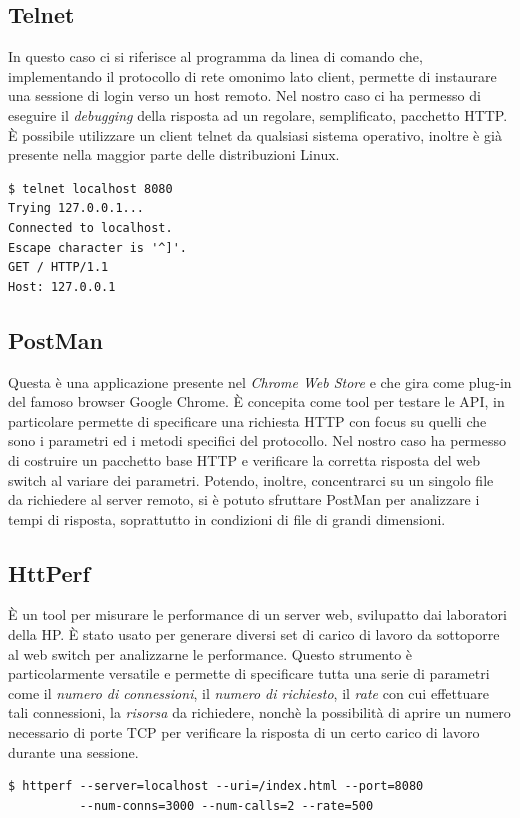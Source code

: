 \documentclass[italian]{tktltiki2}
\begin{document}
\subsection{Telnet}
In questo caso ci si riferisce al programma da linea di comando che, implementando il protocollo di rete omonimo lato client, permette di instaurare una sessione di login verso un host remoto. Nel nostro caso ci ha permesso di eseguire il \emph{debugging} della risposta ad un regolare, semplificato, pacchetto HTTP. È possibile utilizzare un client telnet da qualsiasi sistema operativo, inoltre è già presente nella maggior parte delle distribuzioni Linux.
\begin{lstlisting}
$ telnet localhost 8080
Trying 127.0.0.1...
Connected to localhost.
Escape character is '^]'.
GET / HTTP/1.1
Host: 127.0.0.1
\end{lstlisting}
\subsection{PostMan}
Questa è una applicazione presente nel \emph{Chrome Web Store} e che gira come plug-in del famoso browser Google Chrome. È concepita come tool per testare le API, in particolare permette di specificare una richiesta HTTP con focus su quelli che sono i parametri ed i metodi specifici del protocollo. Nel nostro caso ha permesso di costruire un pacchetto base HTTP e verificare la corretta risposta del web switch al variare dei parametri. Potendo, inoltre, concentrarci su un singolo file da richiedere al server remoto, si è potuto sfruttare PostMan per analizzare i tempi di risposta, soprattutto in condizioni di file di grandi dimensioni.
\subsection{HttPerf} \label{ssec: httperf}
È un tool per misurare le performance di un server web, svilupatto dai laboratori della HP. È stato usato per generare diversi set di carico di lavoro da sottoporre al web switch per analizzarne le performance. Questo strumento è particolarmente versatile e permette di specificare tutta una serie di parametri come il \emph{numero di connessioni}, il \emph{numero di richiesto}, il \emph{rate} con cui effettuare tali connessioni, la \emph{risorsa} da richiedere, nonchè la possibilità di aprire un numero necessario di porte TCP per verificare la risposta di un certo carico di lavoro durante una sessione.
\begin{lstlisting}
$ httperf --server=localhost --uri=/index.html --port=8080
          --num-conns=3000 --num-calls=2 --rate=500

\end{lstlisting}
\end{document}
